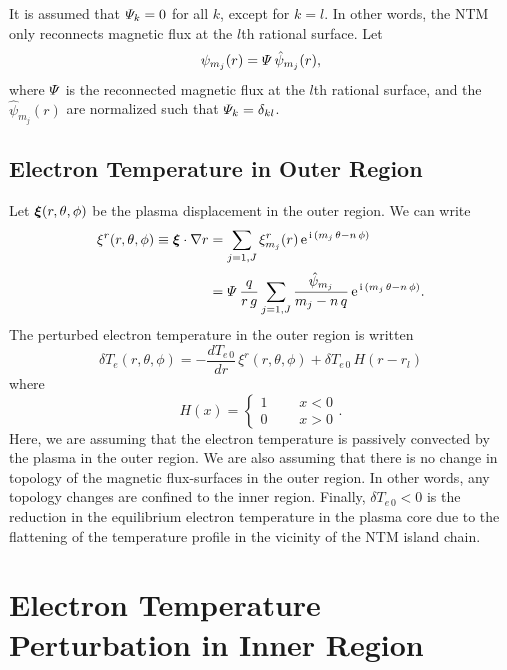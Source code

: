 \documentclass[12pt,prb,aps]{revtex4-1}
\newcommand {\bxi}{\mbox{\boldmath$\xi$}}
\begin{document}
 It is assumed that ${\mit\Psi}_k = 0$ for all $k$, except for $k=l$. In other words, the NTM only reconnects magnetic flux at the
$l$th rational surface. Let 
\begin{equation}
\psi_{m_j}(r) = {\mit\Psi}\,\hat{\psi}_{m_j}(r),
\end{equation}
where ${\mit\Psi}$ is the reconnected magnetic flux at the $l$th rational surface, and the $\hat{\psi}_{m_j}(r)$ are normalized such that ${\mit\Psi}_k
= \delta_{kl}$. 

\subsection{Electron Temperature in Outer Region}
Let $\bxi(r,\theta,\phi)$ be the plasma displacement in the outer region. We can write\,\cite{tear10}
\begin{align}\label{xi}
\xi^r(r,\theta,\phi)\equiv \bxi\cdot\nabla r& = \sum_{j=1,J}\xi_{m_j}^r(r)\,{\rm e}^{\,{\rm i}\,(m_j\,\theta-n\,\phi)}\nonumber\\[0.5ex]
&=
{\mit\Psi}\,\frac{q}{r\,g}\sum_{j=1,J}\frac{\hat{\psi}_{m_j}}{m_j-n\,q}\, {\rm e}^{\,{\rm i}\,(m_j\,\theta-n\,\phi)}.
\end{align}
The perturbed electron temperature  in the outer region is written
\begin{equation}
\delta T_e(r,\theta,\phi)= -\frac{dT_{e\,0}}{dr}\, \xi^r(r,\theta,\phi) + \delta T_{e\,0}\,H(r-r_{l})
\end{equation}
where
\begin{equation}
H(x)= \left\{\begin{array}{ccc}1&~~~&x<0\\0&&x>0\end{array}\right..
\end{equation}
Here, we are assuming that the electron temperature is passively convected by the plasma in the outer region. We are also
assuming that there is no change in topology of the magnetic flux-surfaces in the outer region. In other words, any topology changes are
confined to  the inner region. Finally, $\delta T_{e\,0}<0$ is the reduction in the equilibrium electron temperature in the plasma
core due to the flattening of the temperature profile in the vicinity of the NTM island chain.\cite{chang}

\section{Electron Temperature Perturbation in Inner Region}
\end{document}

